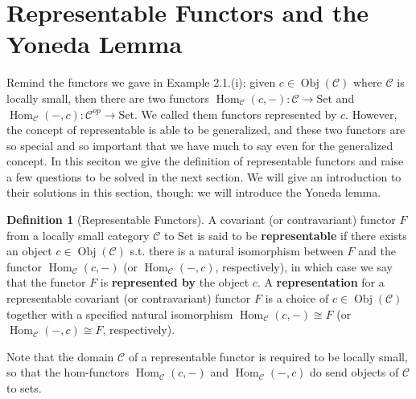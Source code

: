 \documentclass{article}
\theoremstyle{definition}
\newtheorem{definition}{Definition}[section]
\theoremstyle{definition}
\theoremstyle{remark}
\DeclareMathOperator{\Obj}{Obj}
\DeclareMathOperator{\Hom}{Hom}
\begin{document}
\section{Representable Functors and the Yoneda Lemma}
Remind the functors we gave in Example 2.1.(i): given $c\in\Obj(\mathcal{C})$ where $\mathcal{C}$ is locally small, then there are two functors $\Hom_\mathcal{C}(c,-):\mathcal{C}\to\mathrm{Set}$ and $\Hom_\mathcal{C}(-,c):\mathcal{C}^{op}\to \mathrm{Set}$. We called them functors represented by $c$. However, the concept of representable is able to be generalized, and these two functors are so special and so important that we have much to say even for the generalized concept. In this seciton we give the definition of representable functors and 	raise a few questions to be solved in the next section. We will give an introduction to their solutions in this section, though: we will introduce the Yoneda lemma.
	\begin{definition}[Representable Functors]
		A covariant (or contravariant) functor $F$ from a locally small category $\mathcal{C}$ to $\mathrm{Set}$ is said to be \textbf{representable} if there exists an object $c\in\Obj(\mathcal{C})$ s.t. there is a natural isomorphism between $F$ and the functor $\Hom_\mathcal{C}(c,-)$ (or $\Hom_\mathcal{C}(-,c)$, respectively), in which case we say that the functor $F$ is \textbf{represented by} the object $c$. A \textbf{representation} for a representable covariant (or contravariant) functor $F$ is a choice of $c\in\Obj(\mathcal{C})$ together with a specified natural isomorphism $\Hom_\mathcal{C}(c,-)\cong F$ (or $\Hom_\mathcal{C}(-,c)\cong F$, respectively).
	\end{definition}
	Note that the domain $\mathcal{C}$ of a representable functor is required to be locally small, so that the hom-functors $\Hom_\mathcal{C}(c,-)$ and $\Hom_\mathcal{C}(-,c)$ do send objects of $\mathcal{C}$ to sets.
\end{document}
